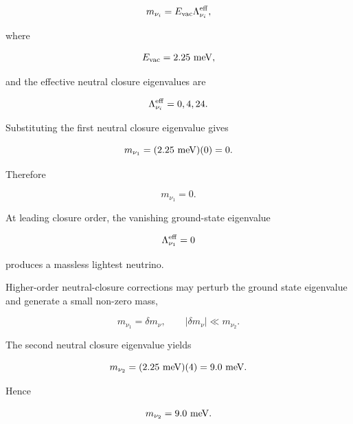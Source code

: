 \documentclass[11pt]{article}
\theoremstyle{definition}
\theoremstyle{remark}
\begin{document}
\begin{equation}
m_{\nu_i}
=
E_{\rm vac}
\Lambda_{\nu_i}^{\rm eff},
\label{eq:neutrino_mass_map_repeat}
\end{equation}

where

\begin{equation}
E_{\rm vac}
=
2.25~{\rm meV},
\end{equation}

and the effective neutral closure eigenvalues are

\begin{equation}
\Lambda_{\nu_i}^{\rm eff} =
{0,4,24}.
\label{eq:neutral_sequence_repeat}
\end{equation}

Substituting the first neutral closure eigenvalue gives

\begin{equation}
m_{\nu_1} = (2.25~{\rm meV})(0) =
0.
\end{equation}

Therefore

\begin{equation}
m_{\nu_1} =
0.
\label{eq:mnu1}
\end{equation}

At leading closure order, the vanishing ground-state
eigenvalue

\begin{equation}
\Lambda_{\nu_1}^{\rm eff}=0
\end{equation}

produces a massless lightest neutrino.

Higher-order neutral-closure corrections may perturb the ground
state eigenvalue and generate a small non-zero mass,

\begin{equation}
m_{\nu_1}
=
\delta m_{\nu},
\qquad
|\delta m_{\nu}|
\ll
m_{\nu_2}.
\label{eq:mnu1_correction}
\end{equation}

The second neutral closure eigenvalue yields

\begin{equation}
m_{\nu_2}
=
(2.25~{\rm meV})(4)
=
9.0~{\rm meV}.
\end{equation}

Hence

\begin{equation}
m_{\nu_2} =
9.0~{\rm meV}.
\label{eq:mnu2}
\end{equation}
\end{document}
